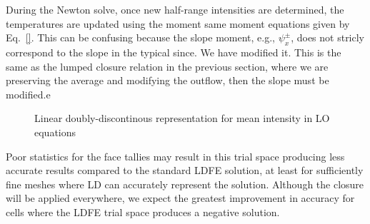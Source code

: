 During the Newton solve, once new half-range
intensities are determined, the temperatures are updated using the moment same moment
equations given by Eq.~\eqref{}. This can be confusing because the slope moment,
e.g., $\psi_x^\pm$, does not stricly correspond to the slope in the typical since.
We have modified it.  This is the same as the lumped closure relation in the previous
section, where we are preserving the average and modifying the outflow, then the
slope must be modified.e 


\begin{figure}[H]
    \centering
    \begin{center}
    \end{center}
    \caption{Linear doubly-discontinous representation for mean intensity in LO equations}
    \label{fig:ldd_space}
\end{figure}


    Poor statistics for the face tallies may result in this trial space producing less
accurate results compared to the standard LDFE solution, at least for sufficiently fine meshes where LD
can accurately represent the solution.  Although the closure will be applied everywhere,
we expect the greatest improvement in accuracy for cells where the LDFE trial space
produces a negative solution.


